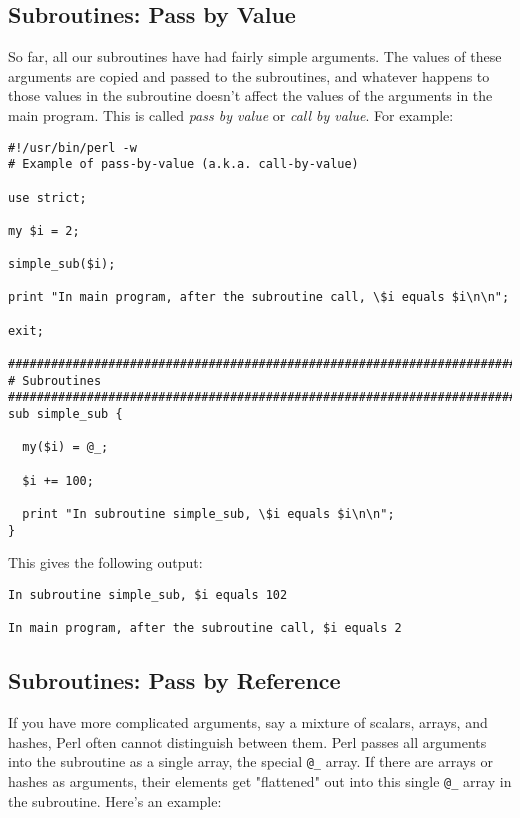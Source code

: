 \subsection{Subroutines: Pass by Value}
\label{sect:section6.4.1}
So far, all our subroutines have had fairly simple arguments. The values of these arguments are copied and passed to the subroutines, and whatever happens to those values in the subroutine doesn't affect the values of the arguments in the main program. This is called \textit{pass by value} or \textit{call by value}. For example: 

\begin{lstlisting}
#!/usr/bin/perl -w
# Example of pass-by-value (a.k.a. call-by-value)

use strict;

my $i = 2;

simple_sub($i);

print "In main program, after the subroutine call, \$i equals $i\n\n";

exit;

################################################################################
# Subroutines
################################################################################
sub simple_sub {

  my($i) = @_;

  $i += 100;

  print "In subroutine simple_sub, \$i equals $i\n\n";
}
\end{lstlisting}

This gives the following output:

\begin{lstlisting}
In subroutine simple_sub, $i equals 102

In main program, after the subroutine call, $i equals 2
\end{lstlisting}

\subsection{Subroutines: Pass by Reference}
If you have more complicated arguments, say a mixture of scalars, arrays, and hashes, Perl often cannot distinguish between them. Perl passes all arguments into the subroutine as a single array, the special \verb|@_| array. If there are arrays or hashes as arguments, their elements get "flattened" out into this single \verb|@_| array in the subroutine. Here's an example: 

